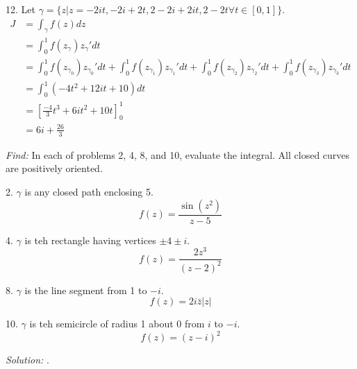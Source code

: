 \documentclass[11pt]{homework}
\begin{document}
12. Let $\gamma = \{ z | z=-2it,-2i+2t,2-2i+2it,2-2t \forall t\in[0,1]\}$.
\begin{align*}
  J &= \int_\gamma f(z) dz \\
    &= \int_0^1 f(z_\gamma) z_\gamma' dt  \\
    &= \int_0^1 f(z_{\gamma_0}) z_{\gamma_0}' dt  + \int_0^1 f(z_{\gamma_1}) z_{\gamma_1}' dt  +
         \int_0^1 f(z_{\gamma_2}) z_{\gamma_2}' dt  + \int_0^1 f(z_{\gamma_3}) z_{\gamma_3}' dt \\
    &= \int_0^1 (-4t^2 +12it+10) dt \\
    &= \left[ \frac{-4}{3} t^3 +6i t^2 +10t\right]_0^1 \\
    &= 6i + \frac{26}{3}
\end{align*}

\newpage
{}
\emph{Find:}
\newline
In each of problems 2, 4, 8, and 10,
evaluate the integral.
All closed curves are positively oriented.

2. $\gamma$ is any closed path enclosing 5.
\begin{equation*}
  f(z) = \frac{\sin(z^2)}{z-5}
\end{equation*}

4. $\gamma$ is teh rectangle having vertices $\pm4\pm i$.
\begin{equation*}
  f(z) = \frac{2z^3}{(z-2)^2}
\end{equation*}

8. $\gamma$ is the line segment from 1 to $-i$.
\begin{equation*}
f(z) = 2i\bar{z}|z|
\end{equation*}

10. $\gamma$ is teh semicircle of radius 1 about 0 from $i$ to $-i$.
\begin{equation*}
f(z) = (z-i)^2
\end{equation*}

\emph{Solution:}
.
\end{document}
